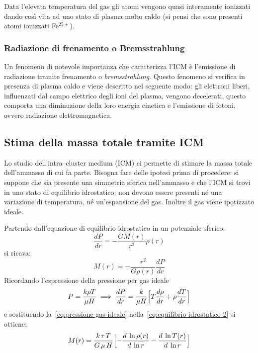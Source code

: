 Data l’elevata temperatura del gas gli atomi vengono quasi interamente ionizzati dando così vita ad uno stato di plasma molto caldo (si pensi che sono presenti atomi ionizzati Fe$^{25+}$).

\subsubsection{Radiazione di frenamento o Bremsstrahlung}\label{sec:bremsstrahlung}
Un fenomeno di notevole importanza che caratterizza l'ICM è l'emissione di radiazione tramite frenamento o \emph{bremsstrahlung}. 
Questo fenomeno si verifica in presenza di plasma caldo e viene descritto nel seguente modo: gli elettroni liberi, influenzati dal campo elettrico degli ioni del plasma, vengono decelerati, questo comporta una diminuzione della loro energia cinetica e l’emissione di fotoni, ovvero radiazione elettromagnetica.

\subsection{Stima della massa totale tramite ICM}
Lo studio dell’intra--cluster medium (ICM) ci permette di stimare la massa totale dell’ammasso di cui fa parte.
Bisogna fare delle ipotesi prima di procedere: 
si suppone che sia presente una simmetria sferica nell’ammasso e che l’ICM si trovi in uno stato di equilibrio idrostatico; non devono essere presenti né una variazione di temperatura, né un’espansione del gas.
Inoltre il gas viene ipotizzato ideale.

\noindent Partendo dall’equazione di equilibrio idrostatico in un potenziale sferico: 
\begin{equation} 
    \frac{dP}{dr} = - \frac{GM(r)}{r^2} \rho(r) 
\end{equation}
si ricava:
\begin{equation}\label{eq:equilibrio-idrostatico-2}
M(r) = - \frac{r^2}{G \rho(r)} \frac{dP}{dr}
\end{equation}
Ricordando l'espressione della pressione per gas ideale
\begin{equation} \label{eq:pressione-gas-ideale}
    P = \frac{k\rho T}{\mu H} \implies \frac{dP}{dr} = \frac{k}{\mu H}\Bigl[ T\frac{d\rho}{dr}+\rho \frac{dT}{dr}\Bigr]
\end{equation}
e sostituendo la~\ref{eq:pressione-gas-ideale} nella~\ref{eq:equilibrio-idrostatico-2} si ottiene:
\begin{equation}
    M(r) = \frac{k\,r\,T}{G\,\mu\,H}\Bigl[-\frac{d\:\ln{\rho(r)}}{d\:\ln{r}} - \frac{d\:\ln{T(r)}}{d\:\ln{r}}\Bigr]
\end{equation}

